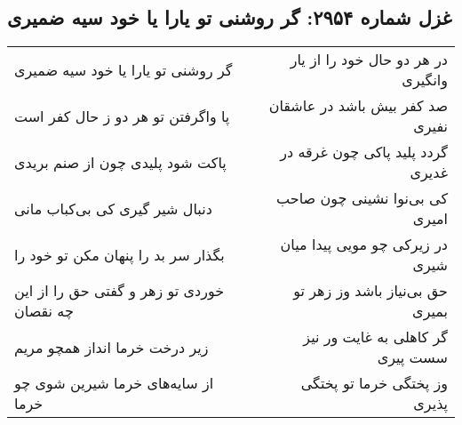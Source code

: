 \begin{center}
\section*{غزل شماره ۲۹۵۴: گر روشنی تو یارا یا خود سیه ضمیری}
\label{sec:2954}
\begin{longtable}{l p{0.5cm} r}
گر روشنی تو یارا یا خود سیه ضمیری
&&
در هر دو حال خود را از یار وانگیری
\\
پا واگرفتن تو هر دو ز حال کفر است
&&
صد کفر بیش باشد در عاشقان نفیری
\\
پاکت شود پلیدی چون از صنم بریدی
&&
گردد پلید پاکی چون غرقه در غدیری
\\
دنبال شیر گیری کی بی‌کباب مانی
&&
کی بی‌نوا نشینی چون صاحب امیری
\\
بگذار سر بد را پنهان مکن تو خود را
&&
در زیرکی چو مویی پیدا میان شیری
\\
خوردی تو زهر و گفتی حق را از این چه نقصان
&&
حق بی‌نیاز باشد وز زهر تو بمیری
\\
زیر درخت خرما انداز همچو مریم
&&
گر کاهلی به غایت ور نیز سست پیری
\\
از سایه‌های خرما شیرین شوی چو خرما
&&
وز پختگی خرما تو پختگی پذیری
\\
\end{longtable}
\end{center}
